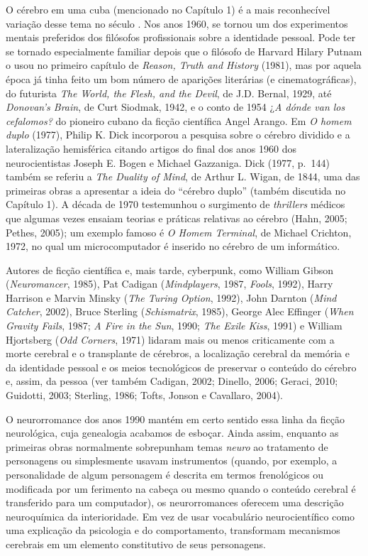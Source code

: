 O cérebro em uma cuba (mencionado no Capítulo 1) é a mais reconhecível
variação desse tema no século . Nos anos 1960, se tornou um dos
experimentos mentais preferidos dos filósofos profissionais sobre a
identidade pessoal. Pode ter se tornado especialmente familiar depois
que o filósofo de Harvard Hilary Putnam o usou no primeiro capítulo de
\emph{Reason, Truth and History} (1981), mas por aquela época já tinha
feito um bom número de aparições literárias (e cinematográficas), do
futurista \emph{The World, the Flesh, and the Devil}, de J.D. Bernal,
1929, até \emph{Donovan's Brain}, de Curt Siodmak, 1942, e o conto de
1954 ¿\emph{A dónde van los cefalomos?} do pioneiro cubano da ficção
científica Angel Arango. Em \emph{O homem duplo} (1977), Philip K. Dick
incorporou a pesquisa sobre o cérebro dividido e a lateralização
hemisférica citando artigos do final dos anos 1960 dos neurocientistas
Joseph E. Bogen e Michael Gazzaniga. Dick (1977, p.~144) também se
referiu a \emph{The Duality of Mind}, de Arthur L. Wigan, de 1844, uma
das primeiras obras a apresentar a ideia do ``cérebro duplo'' (também
discutida no Capítulo 1). A década de 1970 testemunhou o surgimento de
\emph{thrillers} médicos que algumas vezes ensaiam teorias e práticas
relativas ao cérebro (Hahn, 2005; Pethes, 2005); um exemplo famoso é
\emph{O Homem Terminal}, de Michael Crichton, 1972, no qual um
microcomputador é inserido no cérebro de um informático.

Autores de ficção científica e, mais tarde, cyberpunk, como William
Gibson (\emph{Neuromancer}, 1985), Pat Cadigan (\emph{Mindplayers},
1987, \emph{Fools}, 1992), Harry Harrison e Marvin Minsky (\emph{The
Turing Option}, 1992), John Darnton (\emph{Mind Catcher}, 2002), Bruce
Sterling (\emph{Schismatrix}, 1985), George Alec Effinger (\emph{When
Gravity Fails}, 1987; \emph{A Fire in the Sun}, 1990; \emph{The Exile
Kiss}, 1991) e William Hjortsberg (\emph{Odd Corners}, 1971) lidaram
mais ou menos criticamente com a morte cerebral e o transplante de
cérebros, a localização cerebral da memória e da identidade pessoal e os
meios tecnológicos de preservar o conteúdo do cérebro e, assim, da
pessoa (ver também Cadigan, 2002; Dinello, 2006; Geraci, 2010; Guidotti,
2003; Sterling, 1986; Tofts, Jonson e Cavallaro, 2004).

O neurorromance dos anos 1990 mantém em certo sentido essa linha da
ficção neurológica, cuja genealogia acabamos de esboçar. Ainda assim,
enquanto as primeiras obras normalmente sobrepunham temas \emph{neuro}
ao tratamento de personagens ou simplesmente usavam instrumentos
(quando, por exemplo, a personalidade de algum personagem é descrita em
termos frenológicos ou modificada por um ferimento na cabeça ou mesmo
quando o conteúdo cerebral é transferido para um computador), os
neurorromances oferecem uma descrição neuroquímica da interioridade. Em
vez de usar vocabulário neurocientífico como uma explicação da
psicologia e do comportamento, transformam mecanismos cerebrais em um
elemento constitutivo de seus personagens.

